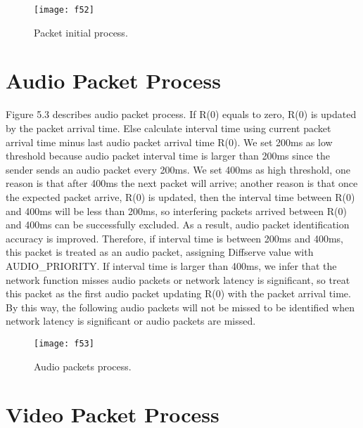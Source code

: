 \documentclass[master]{thesis}
\begin{document}
\begin{figure}[htp]
    \texttt{[image: f52]}
    \caption[Packet initial process.]{Packet initial process.}
    \label{fig:f52}
\end{figure}

\section{Audio Packet Process}

Figure 5.3 describes audio packet process. If R(0) equals to zero, R(0) is updated by the packet arrival time. Else calculate interval time using current packet arrival time minus last audio packet arrival time R(0). We set 200ms as low threshold because audio packet interval time is larger than 200ms since the sender sends an audio packet every 200ms. We set 400ms as high threshold, one reason is that after 400ms the next packet will arrive; another reason is that once the expected packet arrive, R(0) is updated, then the interval time between R(0) and 400ms will be less than 200ms, so interfering packets arrived between R(0) and 400ms can be successfully excluded. As a result, audio packet identification accuracy is improved. Therefore, if interval time is between 200ms and 400ms, this packet is treated as an audio packet, assigning Diffserve value with AUDIO\_PRIORITY. If interval time is larger than 400ms, we infer that the network function misses audio packets or network latency is significant, so treat this packet as the first audio packet updating R(0) with the packet arrival time. By this way, the following audio packets will not be missed to be identified when network latency is significant or audio packets are missed. 

\begin{figure}[htp]
    \texttt{[image: f53]}
    \caption[Audio packets process.]{Audio packets process.}
    \label{fig:f53}
\end{figure}

\section{Video Packet Process}
\end{document}
